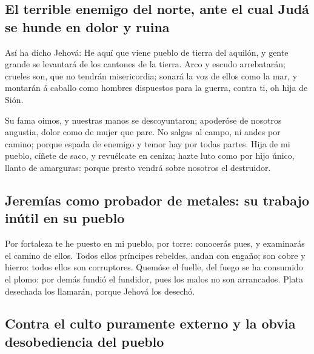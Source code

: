 \hypertarget{el-terrible-enemigo-del-norte-ante-el-cual-juduxe1-se-hunde-en-dolor-y-ruina}{%
\subsection{El terrible enemigo del norte, ante el cual Judá se hunde en
dolor y
ruina}\label{el-terrible-enemigo-del-norte-ante-el-cual-juduxe1-se-hunde-en-dolor-y-ruina}}

 Así ha dicho Jehová: He aquí que viene pueblo de tierra
del aquilón, y gente grande se levantará de los cantones de la tierra.
 Arco y escudo arrebatarán; crueles son, que no tendrán
misericordia; sonará la voz de ellos como la mar, y montarán á caballo
como hombres dispuestos para la guerra, contra ti, oh hija de Sión.

 Su fama oimos, y nuestras manos se descoyuntaron;
apoderóse de nosotros angustia, dolor como de mujer que pare.
 No salgas al campo, ni andes por camino; porque espada de
enemigo y temor hay por todas partes.  Hija de mi pueblo,
cíñete de saco, y revuélcate en ceniza; hazte luto como por hijo único,
llanto de amarguras: porque presto vendrá sobre nosotros el destruidor.

\hypertarget{jeremuxedas-como-probador-de-metales-su-trabajo-inuxfatil-en-su-pueblo}{%
\subsection{Jeremías como probador de metales: su trabajo inútil en su
pueblo}\label{jeremuxedas-como-probador-de-metales-su-trabajo-inuxfatil-en-su-pueblo}}

 Por fortaleza te he puesto en mi pueblo, por torre:
conocerás pues, y examinarás el camino de ellos.  Todos
ellos príncipes rebeldes, andan con engaño; son cobre y hierro: todos
ellos son corruptores.  Quemóse el fuelle, del fuego se ha
consumido el plomo: por demás fundió el fundidor, pues los malos no son
arrancados.  Plata desechada los llamarán, porque Jehová
los desechó.

\hypertarget{contra-el-culto-puramente-externo-y-la-obvia-desobediencia-del-pueblo}{%
\subsection{Contra el culto puramente externo y la obvia desobediencia
del
pueblo}\label{contra-el-culto-puramente-externo-y-la-obvia-desobediencia-del-pueblo}}

